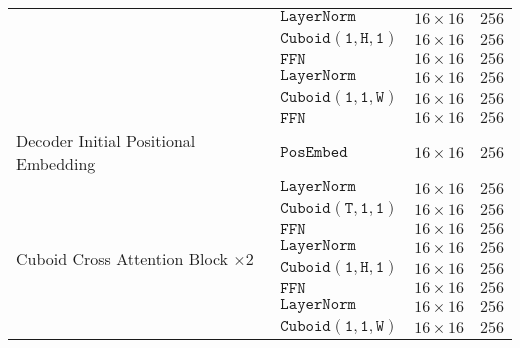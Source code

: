 \documentclass{article}
\begin{document}
\begin{table}[!tb]
\begin{center}
{\begin{tabular}{l|l|c|c}
                                                        & $\mathtt{LayerNorm}$      & $16\times16$                      & $256$             \\
                                                        & $\mathtt{Cuboid(1,H,1)}$  & $16\times16$                      & $256$             \\
                                                        & $\mathtt{FFN}$            & $16\times16$                      & $256$             \\
                                                        & $\mathtt{LayerNorm}$      & $16\times16$                      & $256$             \\
                                                        & $\mathtt{Cuboid(1,1,W)}$  & $16\times16$                      & $256$             \\
                                                        & $\mathtt{FFN}$            & $16\times16$                      & $256$             \\\hline
    \midrule
    Decoder Initial Positional Embedding                & $\mathtt{PosEmbed}$       & $16\times16$                      & $256$             \\\hline
    \multirow{12}{*}{Cuboid Cross Attention Block $\times 2$}& $\mathtt{LayerNorm}$ & $16\times16$                      & $256$             \\
                                                        & $\mathtt{Cuboid(T,1,1)}$  & $16\times16$                      & $256$             \\
                                                        & $\mathtt{FFN}$            & $16\times16$                      & $256$             \\
                                                        & $\mathtt{LayerNorm}$      & $16\times16$                      & $256$             \\
                                                        & $\mathtt{Cuboid(1,H,1)}$  & $16\times16$                      & $256$             \\
                                                        & $\mathtt{FFN}$            & $16\times16$                      & $256$             \\
                                                        & $\mathtt{LayerNorm}$      & $16\times16$                      & $256$             \\
                                                        & $\mathtt{Cuboid(1,1,W)}$  & $16\times16$                      & $256$             \\

\end{tabular}}
\end{center}
\end{table}
\end{document}
